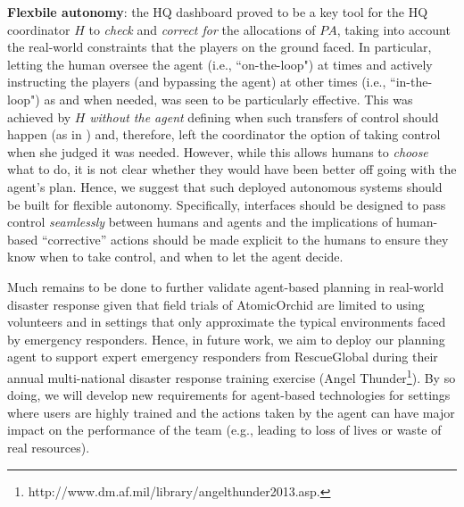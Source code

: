 \noindent \textbf{Flexbile autonomy}: the HQ dashboard proved to be a key tool for the HQ coordinator $H$ to \emph{check} and \emph{correct for} the allocations of $PA$, taking into account the real-world constraints that the players on the ground faced. In particular, letting the human oversee the agent (i.e., ``on-the-loop") at times and actively instructing  the players (and bypassing the agent) at other times (i.e., ``in-the-loop") as and when needed, was seen to be particularly effective. This was achieved by $H$ \emph{without the agent} defining when such transfers of control should happen (as in \cite{scerri:etal:2005}) and, therefore, left the coordinator the option of taking control when she judged it was needed. However, while this allows humans to \emph{choose} what to do, it is not clear whether they would have been better off going with the agent's plan. Hence, we suggest that such deployed autonomous systems should be built for flexible autonomy. Specifically, interfaces should be designed to pass control \emph{seamlessly} between humans and agents and the implications of human-based ``corrective'' actions  should be made explicit to the humans to ensure they know when to take control, and when to let the agent decide.

Much remains to be done to further validate agent-based planning in real-world disaster response given that field trials of AtomicOrchid are limited to using volunteers and in settings that only approximate the typical environments faced by emergency responders. Hence, in future work, we aim to deploy our planning agent to support expert emergency responders from RescueGlobal during their annual multi-national disaster response training exercise  (Angel Thunder\footnote{http://www.dm.af.mil/library/angelthunder2013.asp.}). By so doing, we will develop new requirements for agent-based technologies for settings where users are highly trained and the actions taken by the agent can have major impact on the performance of the team (e.g., leading to loss of lives or waste of real resources).
